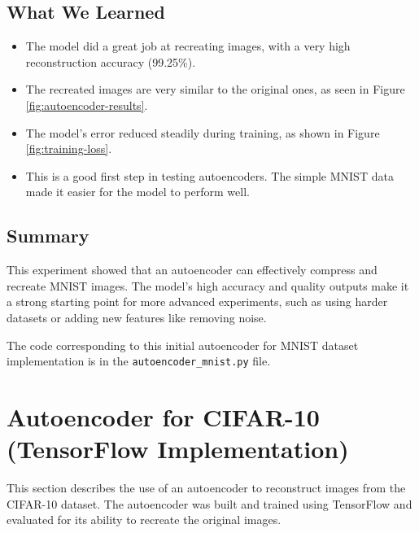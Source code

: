 \documentclass[lettersize,journal]{IEEEtran}
\begin{document}
\subsection{\textbf{What We Learned}}
\begin{itemize}
    \item The model did a great job at recreating images, with a very high reconstruction accuracy (99.25\%).
    \item The recreated images are very similar to the original ones, as seen in Figure \ref{fig:autoencoder-results}.
    \item The model’s error reduced steadily during training, as shown in Figure \ref{fig:training-loss}.
    \item This is a good first step in testing autoencoders. The simple MNIST data made it easier for the model to perform well.
\end{itemize}

\subsection{\textbf{Summary}}
This experiment showed that an autoencoder can effectively compress and recreate MNIST images. The model’s high accuracy and quality outputs make it a strong starting point for more advanced experiments, such as using harder datasets or adding new features like removing noise.

The code corresponding to this initial autoencoder for MNIST dataset implementation is in the \texttt{autoencoder\_mnist.py} file.

\section{\textbf{Autoencoder for CIFAR-10 (TensorFlow Implementation)}}

This section describes the use of an autoencoder to reconstruct images from the CIFAR-10 dataset. The autoencoder was built and trained using TensorFlow and evaluated for its ability to recreate the original images.
\end{document}
